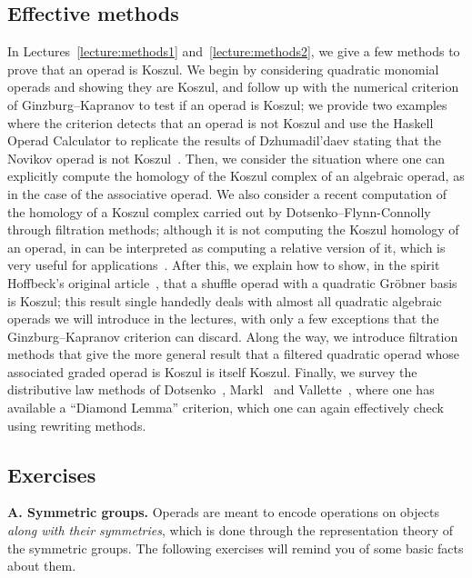 \subsection{Effective methods}

In Lectures~\ref{lecture:methods1} and~\ref{lecture:methods2}, we give
a few methods to prove that an operad is Koszul.
We begin by considering quadratic monomial operads and showing
they are Koszul, and follow up with the numerical criterion
of Ginzburg--Kapranov to test if an operad is Koszul; we
provide two examples where the criterion detects
that an operad is not Koszul and use the \textsf{Haskell Operad
Calculator} to replicate the results of Dzhumadil'daev
stating that the Novikov operad is not 
Koszul~\cite{Dzhumadildaev2009}.
Then, we consider the situation where one
can explicitly compute the homology of the
Koszul complex of an algebraic operad,
as in the case of the associative operad.
We also consider a recent computation
of the homology of a Koszul complex 
carried out by Dotsenko--Flynn-Connolly~\cite{Dotsenko2020Schur}
through filtration methods; although it is
not computing the Koszul homology of an operad,
in can be interpreted as computing a
relative version of it, which is very useful
for applications~\cite{DotsenkoTamaroff2020}. 
After this, we explain how to show, in the
spirit 
Hoffbeck's original article~\cite{Hoffbeck2009},
that a shuffle operad with a quadratic
Gr\"obner basis is Koszul; this result
single handedly deals with almost all 
quadratic algebraic operads we will introduce
in the lectures, with only a few exceptions
that the Ginzburg--Kapranov criterion can
discard. Along the way, we introduce filtration
methods that give the more general result that
a filtered quadratic operad whose associated
graded operad is Koszul is itself Koszul.
Finally, we survey the distributive law methods
of Dotsenko~\cite{Dotsenko2007}, Markl~\cite{MarklDistributive}
and Vallette~\cite{Vallette2004}, where one
has available a ``Diamond Lemma'' criterion,
which one can again effectively check using
rewriting methods. 

\newpage

\subsection{Exercises}
 
\textbf{A. Symmetric groups.} Operads are meant to encode
operations on objects \emph{along with their symmetries},
which is done through the representation theory of the
symmetric groups. The following exercises will remind
you of some basic facts about them.


